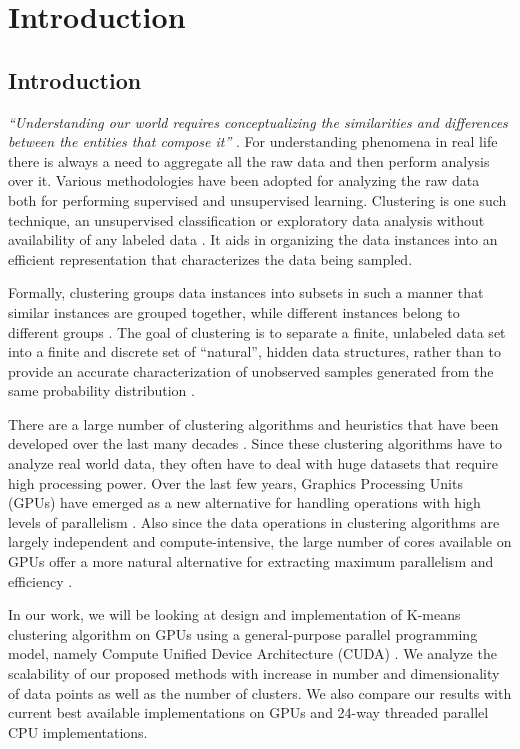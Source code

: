 \chapter{Introduction}
\section{Introduction}

\emph{ ``Understanding our world requires conceptualizing the similarities and differences between the entities that compose it'' } \cite{tryon}.
For understanding phenomena in real life there is always a need to aggregate all the raw data and then perform analysis over it. Various methodologies have been adopted for analyzing the raw data both for performing supervised and unsupervised learning. Clustering is one such technique, an unsupervised classification or exploratory data analysis without availability of any labeled data \cite{Xu:2009}. It aids in organizing the data instances into an efficient representation that characterizes the data being sampled.

Formally, clustering groups data instances into subsets in such a manner that similar instances are grouped together, while different instances belong to different groups \cite{lior}. The goal of clustering is to separate a finite, unlabeled data set into a finite and discrete set of ``natural'', hidden data structures, rather than to provide an accurate characterization of unobserved samples generated from the same probability distribution \cite{baraldi,mulier}.

There are a large number of clustering algorithms and heuristics that have been developed over the last many decades \cite{Jain:1999,lior,Xu:2009}. Since these clustering algorithms have to analyze real world data, they often have to deal with huge datasets that require high processing power. Over the last few years, Graphics Processing Units (GPUs) have emerged as a new alternative for handling operations with high levels of parallelism \cite{kirk}. Also since the data operations in clustering algorithms are largely independent and compute-intensive, the large number of cores available on GPUs offer a more natural alternative for extracting maximum parallelism and efficiency \cite{che_et_al}.

In our work, we will be looking at design and implementation of K-means clustering algorithm on GPUs using a general-purpose parallel programming model, namely Compute Unified Device Architecture (CUDA) \cite{cuda}. We analyze the scalability of our proposed methods with increase in number and dimensionality of data points as well as the number of clusters. We also compare our results with current best available implementations on GPUs and 24-way threaded parallel CPU implementations.

